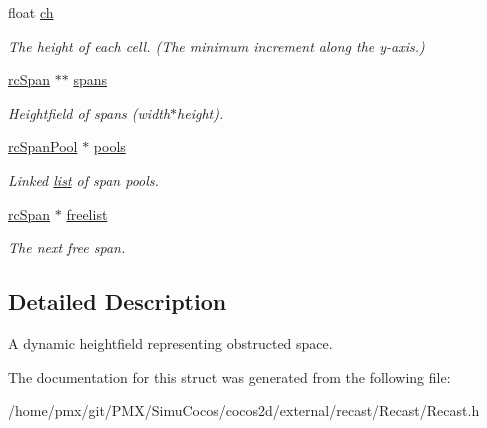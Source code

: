 \begin{DoxyCompactItemize}
\mbox{\label{structrcHeightfield_a23488349cb552d5410e29d089234effc}} 
float \hyperlink{structrcHeightfield_a23488349cb552d5410e29d089234effc}{ch}
\begin{DoxyCompactList}\small\item\em The height of each cell. (The minimum increment along the y-\/axis.) \end{DoxyCompactList}\item 
\mbox{\label{structrcHeightfield_aefbfec1f80ef61023994371f90e317ee}} 
\hyperlink{structrcSpan}{rc\+Span} $\ast$$\ast$ \hyperlink{structrcHeightfield_aefbfec1f80ef61023994371f90e317ee}{spans}
\begin{DoxyCompactList}\small\item\em Heightfield of spans (width$\ast$height). \end{DoxyCompactList}\item 
\mbox{\label{structrcHeightfield_a2c3d7f8d23f2681bb60797ab5465f83d}} 
\hyperlink{structrcSpanPool}{rc\+Span\+Pool} $\ast$ \hyperlink{structrcHeightfield_a2c3d7f8d23f2681bb60797ab5465f83d}{pools}
\begin{DoxyCompactList}\small\item\em Linked \hyperlink{protocollist-p}{list} of span pools. \end{DoxyCompactList}\item 
\mbox{\label{structrcHeightfield_aa4bb2a65d28dc333ba410616801ab4cb}} 
\hyperlink{structrcSpan}{rc\+Span} $\ast$ \hyperlink{structrcHeightfield_aa4bb2a65d28dc333ba410616801ab4cb}{freelist}
\begin{DoxyCompactList}\small\item\em The next free span. \end{DoxyCompactList}\end{DoxyCompactItemize}


\subsection{Detailed Description}
A dynamic heightfield representing obstructed space. 

The documentation for this struct was generated from the following file\+:\begin{DoxyCompactItemize}
\item 
/home/pmx/git/\+P\+M\+X/\+Simu\+Cocos/cocos2d/external/recast/\+Recast/Recast.\+h\end{DoxyCompactItemize}
